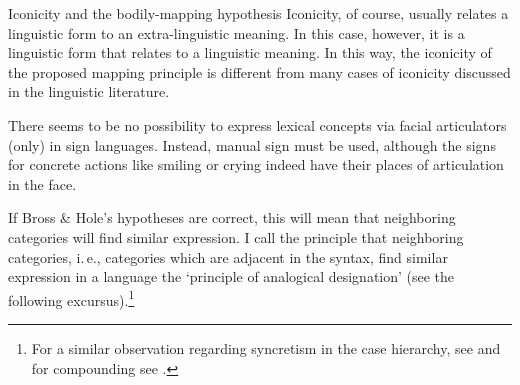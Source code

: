 \begin{digression}{Iconicity and the bodily-mapping hypothesis}{}
Iconicity, of course, usually relates a linguistic form to an extra-linguistic meaning. In this case, however, it is a linguistic form that relates to a linguistic meaning. In this way, the iconicity of the proposed mapping principle is different from many cases of iconicity discussed in the linguistic literature.




\end{digression}

\noindent There seems to be no possibility to express lexical concepts via facial articulators (only) in sign languages. Instead, manual sign must be used, although the signs for concrete actions like smiling or crying indeed have their places of articulation in the face. 

If Bross \& Hole's hypotheses are correct, this will mean that neighboring categories will find similar expression. I call the principle that neighboring categories, i.\,e., categories which are adjacent in the syntax, find similar expression in a language the `principle of analogical designation' (see the following excursus).\footnote{ For a similar observation regarding syncretism in the case hierarchy, see \citet{caha2009nanosyntax} and for compounding see \citet{hole2015arguments}.}

